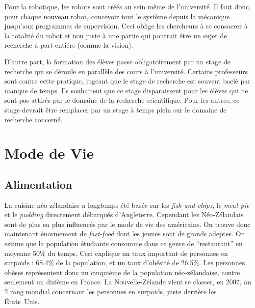 \documentclass[11pt,journal]{RapportFR}
\newcommand{\Nz}{Nouvelle-Z\'elande\xspace}
\newcommand{\nze}{n\'eo-z\'elandaise\xspace}
\newcommand{\Nzs}{N\'eo-Z\'elandais\xspace}
\begin{document}
Pour la robotique, les robots sont cr\'e\'es au sein m\^eme de l'universit\'e.%
Il faut donc, pour chaque nouveau robot, concevoir tout le syst\`eme depuis la m\'ecanique jusqu'aux programmes de supervision.
Ceci oblige les chercheurs \`a se consacrer \`a la totalit\'e du robot et non juste \`a une partie qui pourrait \^etre un sujet de recherche \`a part enti\'ere (comme la vision). 

D'autre part, la formation des \'el\`eves passe obligatoirement par un stage de recherche qui se d\'eroule en parall\`ele des cours \`a l'universit\'e.
Certains professeurs sont contre cette pratique, jugeant que le stage de recherche est souvent bacl\'e par manque de temps. Ils souhaitent que ce stage disparaissent pour les \'el\`eves qui ne sont pas attir\'es par le domaine de la recherche scientifique. Pour les autres, ce stage devrait \^etre remplacer par un stage \`a temps plein sur le domaine de recherche concern\'e.



\section{Mode de Vie}
\label{sec:life}


\subsection{Alimentation}
\label{sub:food}

La cuisine \nze a longtemps été basée sur les \emph{fish and chips}, le \emph{meat pie} et le \emph{pudding} directement débarqués d’Angleterre.
Cependant les \Nzs sont de plus en plus influenc\'es par le mode de vie des am\'ericains. On trouve donc maintenant \'enormement de \textit{fast-food} dont les jeunes sont de grands adeptes.
On estime que la population \'etudiante consomme dans ce genre de ``restaurant'' en moyenne 50\% du temps.
Ceci explique un taux important de personnes en surpoids : 68.4\% de la population, et un taux d'ob\'esit\'e de 26.5\%. Les personnes ob\`eses repr\'esentent donc un cinqui\`eme de la population \nze, contre seulement un dizi\`eme en France.
La \Nz vient se classer, en 2007, au 2 rang mondial concernant les personnes en surpoids, juste derri\`ere les \'Etats~Unis.
\end{document}
